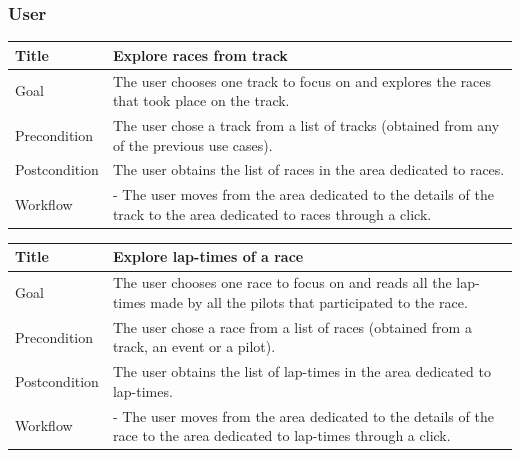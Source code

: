 \documentclass{beamer}
\begin{document}

\begin{frame}
    \frametitle{User}
    \begin{table}
        \tiny
        \begin{tabular}{|p{2cm}|p{6cm}|}
        \hline
        Title & \textbf{Explore races from track} \\
        \hline
        Goal & The user chooses one track to focus on and explores the races that took place on the track. \\
        \hline
        Precondition & The user chose a track from a list of tracks (obtained from any of the previous use cases).\\
        \hline
        Postcondition & The user obtains the list of races in the area dedicated to races. \\
        \hline
        Workflow &
        - The user moves from the area dedicated to the details of the track to the
        area dedicated to races through a click. \\
        \hline
        \end{tabular}
\end{table}

\begin{table}
    \tiny
    \begin{tabular}{|p{2cm}|p{6cm}|}
    \hline
    Title & \textbf{Explore lap-times of a race} \\
    \hline
    Goal & The user chooses one race to focus on and reads all the lap-times made by all the pilots 
    that participated to the race.\\
    \hline
    Precondition & The user chose a race from a list of races (obtained from a track, an event or a pilot).\\
    \hline
    Postcondition & The user obtains the list of lap-times in the area dedicated to lap-times. \\
    \hline
    Workflow &
    - The user moves from the area dedicated to the details of the race to the
    area dedicated to lap-times through a click. \\
    \hline
    \end{tabular}
\end{table}
\end{frame}


\end{document}
